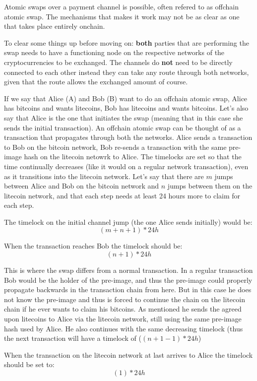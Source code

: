 Atomic swaps over a payment channel is possible, often refered to as offchain atomic swap. The mechanisms that makes it work may not be as clear as one that takes place entirely onchain. 

To clear some things up before moving on: \textbf{both} parties that are performing the swap needs to have a functioning node on the respective networks of the cryptocurrencies to be exchanged. The channels do \textbf{not} need to be directly connected to each other instead they can take any route through both networks, given that the route allows the exchanged amount of course.

If we say that Alice (A) and Bob (B) want to do an offchain atomic swap, Alice has bitcoins and wants litecoins, Bob has litecoins and wants bitcoins. Let's also say that Alice is the one that initiates the swap (meaning that in this case she sends the initial transaction). An offchain atomic swap can be thought of as a transaction that propagates through both the networks. Alice sends a transaction to Bob on the bitcoin network, Bob re-sends a transaction with the same pre-image hash on the litecoin netowrk to Alice. The timelocks are set so that the time continually decreases (like it would on a regular network transaction), even as it transitions into the litecoin network. Let's say that there are $m$ jumps between Alice and Bob on the bitcoin network and $n$ jumps between them on the litecoin network, and that each step needs at least 24 hours more to claim for each step. 

The timelock on the initial channel jump (the one Alice sends initially) would be:
$$(m+n+1) * 24h$$

When the transaction reaches Bob the timelock should be: 
$$(n+1) * 24h$$

This is where the swap differs from a normal transaction. In a regular transaction Bob would be the holder of the pre-image, and thus the pre-image could properly propagate backwards in the transaction chain from here. But in this case he does not know the pre-image and thus is forced to continue the chain on the litecoin chain if he ever wants to claim his bitcoins. As mentioned he sends the agreed upon litecoins to Alice via the litecoin network, still using the same pre-image hash used by Alice. He also continues with the same decreasing timelock (thus the next transaction will have a timelock of ($(n+1 - 1) * 24h$)

When the transaction on the litecoin network at last arrives to Alice the timelock should be set to:
$$(1) * 24h$$

